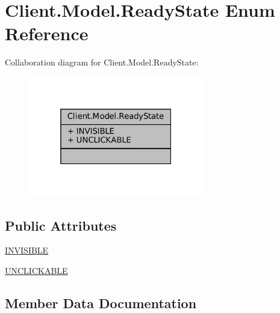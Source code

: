 \hypertarget{enumClient_1_1Model_1_1ReadyState}{}\section{Client.\+Model.\+Ready\+State Enum Reference}
\label{enumClient_1_1Model_1_1ReadyState}


Collaboration diagram for Client.\+Model.\+Ready\+State\+:
\nopagebreak
\begin{figure}[H]
\begin{center}
\leavevmode
\includegraphics[width=217pt]{enumClient_1_1Model_1_1ReadyState__coll__graph}
\end{center}
\end{figure}
\subsection*{Public Attributes}
\begin{DoxyCompactItemize}
\item 
\mbox{\hyperlink{enumClient_1_1Model_1_1ReadyState_a1af85003e6591619effc0216684d9235}{I\+N\+V\+I\+S\+I\+B\+LE}}
\item 
\mbox{\hyperlink{enumClient_1_1Model_1_1ReadyState_acd3251fb20416d6aa8ea238102f3d9f2}{U\+N\+C\+L\+I\+C\+K\+A\+B\+LE}}
\end{DoxyCompactItemize}


\subsection{Member Data Documentation}
\mbox{\label{enumClient_1_1Model_1_1ReadyState_a1af85003e6591619effc0216684d9235}} 
